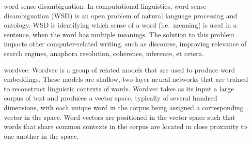 \documentclass[]{book}
\begin{document}
word-sense disambiguation: In computational linguistics, word-sense
disambiguation (WSD) is an open problem of natural language processing
and ontology. WSD is identifying which sense of a word (i.e.~meaning) is
used in a sentence, when the word has multiple meanings. The solution to
this problem impacts other computer-related writing, such as discourse,
improving relevance of search engines, anaphora resolution, coherence,
inference, et cetera.

wordvec: Wordvec is a group of related models that are used to produce
word embeddings. These models are shallow, two-layer neural networks
that are trained to reconstruct linguistic contexts of words. Wordvec
takes as its input a large corpus of text and produces a vector space,
typically of several hundred dimensions, with each unique word in the
corpus being assigned a corresponding vector in the space. Word vectors
are positioned in the vector space such that words that share common
contexts in the corpus are located in close proximity to one another in
the space.


\end{document}
